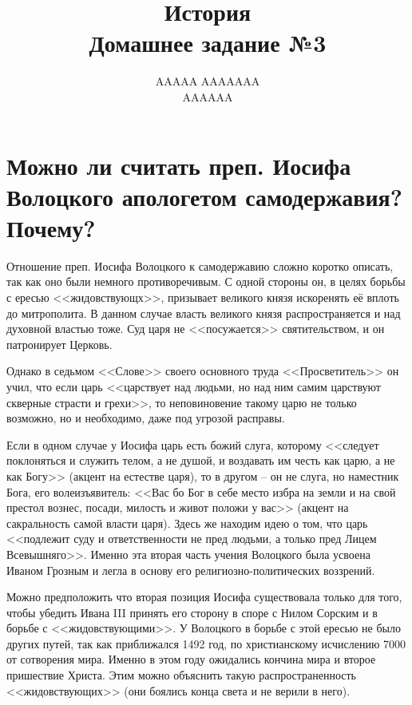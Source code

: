 \documentclass[12pt]{article}
\title{История \\ Домашнее задание №3}
\author{AAAAA AAAAAAA \\ AAAAAA}
\begin{document}
  \maketitle
  \setcounter{section}{2}

  \section{Можно ли считать преп. Иосифа Волоцкого апологетом\protect\footnotemark{} самодержавия\protect\footnotemark{}? Почему?}
  \addtocounter{footnote}{-2}

  Отношение преп. Иосифа Волоцкого к самодержавию сложно коротко описать, так как оно были немного противоречивым.
  С одной стороны он, в целях борьбы с ересью <<жидовствующх>>, призывает великого князя искоренять её вплоть до митрополита.
  В данном случае власть великого князя распространяется и над духовной властью тоже.
  Суд царя не <<посужается>> святительством, и он патронирует Церковь.

  Однако в седьмом <<Слове>> своего основного труда <<Просветитель>> он учил,
  что если царь <<царствует над людьми, но над ним самим царствуют скверные страсти и грехи>>,
  то неповиновение такому царю не только возможно, но и необходимо, даже под угрозой расправы.

  Если в одном случае у Иосифа царь есть божий слуга,
  которому <<следует поклоняться и служить телом, а не душой, и воздавать им честь как царю, а не как Богу>> (акцент на естестве царя),
  то в другом -- он не слуга, но наместник Бога, его волеизъявитель:
  <<Вас бо Бог в себе место избра на земли и на свой престол вознес, посади, милость и живот положи у вас>>
  (акцент на сакральность самой власти царя).
  Здесь же находим идею о том, что царь <<подлежит суду и ответственности не пред людьми, а только пред Лицем Всевышняго>>.
  Именно эта вторая часть учения Волоцкого была усвоена Иваном Грозным и легла в основу его религиозно-политических воззрений.

  Можно предположить что вторая позиция Иосифа существовала только для того,
  чтобы убедить Ивана III принять его сторону в споре с Нилом Сорским и в борьбе с <<жидовствующими>>.
  У Волоцкого в борьбе с этой ересью не было других путей, так как приближался 1492 год, по христианскому исчислению 7000 от сотворения мира.
  Именно в этом году ожидались кончина мира и второе пришествие Христа.
  Этим можно объяснить такую распространенность <<жидовствующих>> (они боялись конца света и не верили в него).
\end{document}
